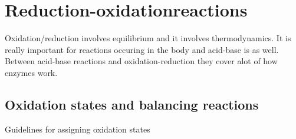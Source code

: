 \documentclass[../mit-general-chemistry.tex]{subfiles}
\begin{document}
\chapter{Reduction-oxidationreactions}


Oxidation/reduction involves equilibrium and it involves
thermodynamics. It is really important for reactions occuring in the
body and acid-base is as well. Between acid-base reactions and
oxidation-reduction they cover alot of how enzymes work.




\section{Oxidation states and balancing reactions}


Guidelines for assigning oxidation states
\end{document}
